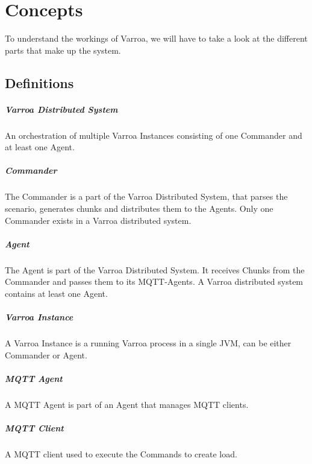 \chapter{Concepts}
To understand the workings of Varroa, we will have to take a look at the different parts that make up the system.


\section{Definitions}

\paragraph{Varroa Distributed System}
An orchestration of multiple Varroa Instances consisting of one Commander and at least one Agent.

\paragraph{Commander}
The Commander is a part of the Varroa Distributed System, that parses the scenario, generates chunks and distributes them to the Agents.
Only one Commander exists in a Varroa distributed system.

\paragraph{Agent}
The Agent is part of the Varroa Distributed System.
It receives Chunks from the Commander and passes them to its MQTT-Agents.
A Varroa distributed system contains at least one Agent.

\paragraph{Varroa Instance}
A Varroa Instance is a running Varroa process in a single JVM, can be either Commander or Agent.

\paragraph{MQTT Agent}
A MQTT Agent is part of an Agent that manages MQTT clients.


\paragraph{MQTT Client}
A MQTT client used to execute the Commands to create load.

